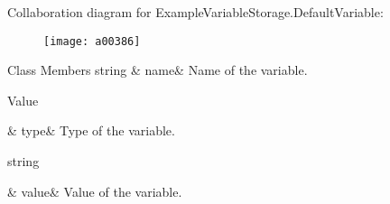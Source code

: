 Collaboration diagram for Example\-Variable\-Storage.\-Default\-Variable\-:
\nopagebreak
\begin{figure}[H]
\begin{center}
\leavevmode
\texttt{[image: a00386]}
\end{center}
\end{figure}
\begin{DoxyFields}{Class Members}
\hypertarget{a00089_a609feaa53936e7dc42248ff2ba68454a}{string}\label{a00089_a609feaa53936e7dc42248ff2ba68454a}
&
name&
Name of the variable. \\
\hline

\hypertarget{a00089_a904347efdca12f40243c7dedb646153d}{Value}\label{a00089_a904347efdca12f40243c7dedb646153d}
&
type&
Type of the variable. \\
\hline

\hypertarget{a00089_a0f00ecb21b58aa754a4bbb61edf62818}{string}\label{a00089_a0f00ecb21b58aa754a4bbb61edf62818}
&
value&
Value of the variable. \\
\hline

\end{DoxyFields}
